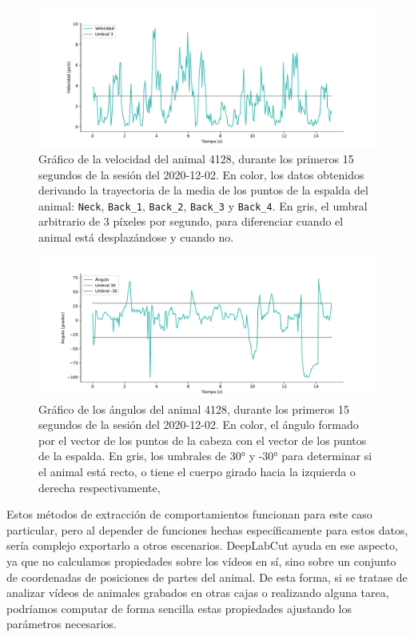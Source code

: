 \begin{figure}[h]
  \centering
  \includegraphics[width=\textwidth]{figures/speed-4128-2020-12-02-threshold-3-15s.pdf}
  \caption[Velocidad del animal.]{Gráfico de la velocidad del animal 4128, durante los primeros 15 segundos de la sesión del 2020-12-02. En color, los datos obtenidos derivando la trayectoria de la media de los puntos de la espalda del animal: \texttt{Neck}, \texttt{Back\_1}, \texttt{Back\_2}, \texttt{Back\_3} y \texttt{Back\_4}. En gris, el umbral arbitrario de 3 píxeles por segundo, para diferenciar cuando el animal está desplazándose y cuando no.}
  \label{fig:speed}
\end{figure}

\begin{figure}[h]
  \centering
  \includegraphics[width=\textwidth]{figures/angles-4128-2020-12-02-threshold-30-15s.pdf}
  \caption[Ángulos del animal.]{Gráfico de los ángulos del animal 4128, durante los primeros 15 segundos de la sesión del 2020-12-02. En color, el ángulo formado por el vector de los puntos de la cabeza con el vector de los puntos de la espalda. En gris, los umbrales de 30° y -30° para determinar si el animal está recto, o tiene el cuerpo girado hacia la izquierda o derecha respectivamente,}
  \label{fig:angles}
\end{figure}

Estos métodos de extracción de comportamientos funcionan para este caso particular, pero al depender de funciones hechas específicamente para estos datos, sería complejo exportarlo a otros escenarios. DeepLabCut ayuda en ese aspecto, ya que no calculamos propiedades sobre los vídeos en sí, sino sobre un conjunto de coordenadas de posiciones de partes del animal. De esta forma, si se tratase de analizar vídeos de animales grabados en otras cajas o realizando alguna tarea, podríamos computar de forma sencilla estas propiedades ajustando los parámetros necesarios.


